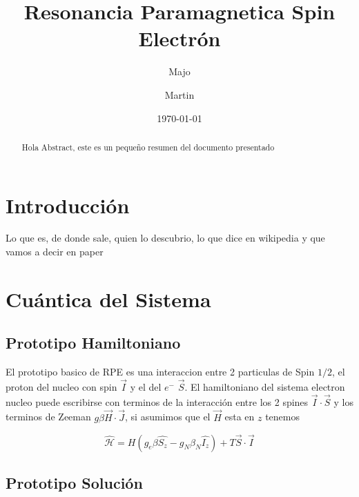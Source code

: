 \documentclass[%
amssymb,prb,aps,superscriptaddress]{revtex4}
\begin{document}
\begin{abstract}
    Hola Abstract, este es un pequeño resumen del documento presentado
\end{abstract}

\title{Resonancia Paramagnetica Spin Electrón}
\author{Majo}


\author{Martin}


\date{\today}

\maketitle

\section[Intro]{Introducción}
\label{sec:intro}

Lo que es, de donde sale, quien lo descubrio, lo que dice en wikipedia y que vamos a decir en paper

\section[]{Cuántica del Sistema}
\label{sec:cuantica}

\subsection{Prototipo Hamiltoniano}

El prototipo basico de RPE es una interaccion entre 2 particulas de Spin $1/2$, el proton del nucleo con spin $\vec{I}$ y el del $e^-$ $\vec{S}$. El hamiltoniano del sistema electron nucleo puede escribirse con terminos de la interacción entre los 2 spines $ \vec{I} \cdot \vec{S} $ y los terminos de Zeeman $g \beta \vec{H} \cdot \vec{J}$, si asumimos que el $\vec{H}$ esta en $z$ tenemos

\begin{equation}
    \label{eq:hamiltonianoDelSistema}
    \mathcal{\hat{H}} = H (g_e \beta \hat{S_z} - g_N \beta_N \hat{I_z}) + T \vec{S} \cdot \vec{I} 
\end{equation}

\subsection{Prototipo Solución}
\end{document}
